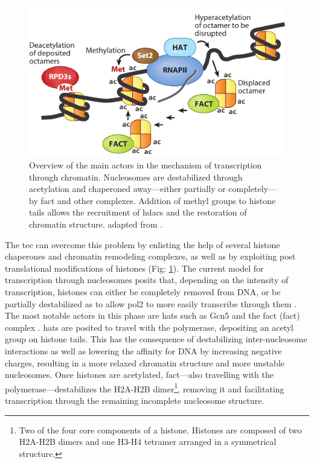\begin{figure}[ht]

\centering
\includegraphics[width=\textwidth]{figures/introduction/nucTranscription}
\caption[Mechanism of transcription through chromatin.]{Overview of the main actors in the mechanism of transcription through chromatin.
Nucleosomes are destabilized through acetylation and chaperoned away---either partially or completely---by \gls{fact} and other complexes.
Addition of methyl groups to histone tails allows the recruitment of \gls{hdacs} and the restoration of chromatin structure.
adapted from \citep{selth:2010:transcript}. }
\label{fig:nucTranscription}

\end{figure}

The \gls{tec} can overcome this problem by enlisting the help of several histone chaperones and chromatin remodeling complexes, as well as by exploiting post translational modifications of histones (Fig: \ref{fig:nucTranscription}). 
The current model for transcription through nucleosomes posits that, depending on the intensity of transcription, histones can either be completely removed from DNA, or be partially destabilized as to allow \gls{pol2} to more easily transcribe through them \citep{kulaeva:2013:mechanism}.
The most notable actors in this phase are \gls{hats} such as Gcn5 and the \gls{fact} (\glsdesc{fact}) complex \citep[for review see:][]{reinberg:2006:de}. 
\gls{hats} are posited to travel with the polymerase, depositing an acetyl group on histone tails.
This has the consequence of destabilizing inter-nucleosome interactions as well as lowering the affinity for DNA by increasing negative charges, resulting in a more relaxed chromatin structure and more unstable nucleosomes.
Once histones are acetylated, \gls{fact}---also travelling with the polymerase---destabilizes the H2A-H2B dimer\footnote{Two of the four core components of a histone. Histones are composed of two H2A-H2B dimers and one H3-H4 tetramer arranged in a symmetrical structure. 
}, removing it and facilitating transcription through the remaining incomplete nucleosome structure. 

